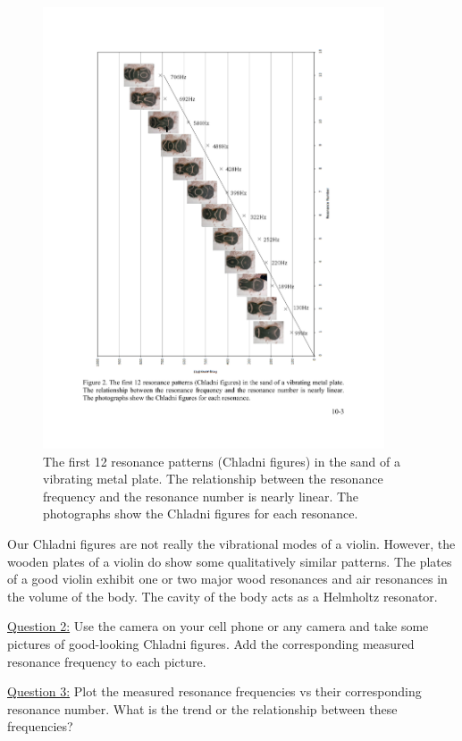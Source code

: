 \documentclass[11pt]{NSF}
\begin{document}
\begin{figure}[hbtp]
\begin{center}
\includegraphics[width=0.9\textwidth]{fig10_2}
\caption{The first 12 resonance patterns (Chladni figures) in the sand
of a vibrating metal plate. The relationship between the resonance
frequency and the resonance number is nearly linear. The photographs
show the Chladni figures for each resonance.}
\label{f:2}
\end{center}
\end{figure}
%

Our Chladni figures are not really the vibrational modes of a violin.
However, the wooden plates of a violin do show some qualitatively
similar patterns. 
The plates of a good violin exhibit one or two major wood resonances 
and air resonances in the volume of the body. 
The cavity of the body acts as a Helmholtz resonator.


\underline{Question 2:}
Use the camera on your cell phone or any camera and take some pictures of good-looking
Chladni figures. Add the corresponding measured resonance frequency to each picture. 

\underline{Question 3:}
Plot the measured resonance frequencies vs their corresponding resonance number. What is the trend or the relationship
between these frequencies?
\end{document}
